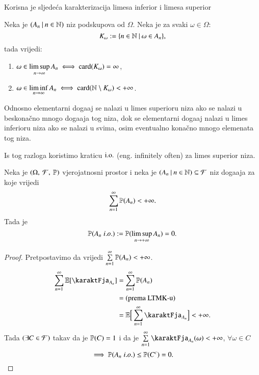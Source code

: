 Korisna je sljede\' ca karakterizacija limesa inferior i limesa superior

\begin{prop}    \label{prop:9.1-2}
    Neka je $({A_n} \: | \: {n \in \mathbb{N}})$ niz podskupova od $\Omega$.
    Neka je za svaki $\omega \in \Omega$:
    \begin{equation*}
        K_\omega := \{{n \in \mathbb{N}} \: | \: {\omega \in A_n}\},
    \end{equation*}
    tada vrijedi:
    \begin{enumerate}[label=(\arabic*)]
        \item $\omega \in \limsup\limits_{n \to \infty} A_n \iff \textnormal{card}({K_\omega}) = \infty$,
        \item $\omega \in \liminf\limits_{n \to \infty} A_n \iff \textnormal{card}({\mathbb{N} \setminus K_\omega}) < +\infty$.
    \end{enumerate}
\end{prop}

Odnosno elementarni doga\dj aj se nalazi u limes superioru niza ako se nalazi u beskona\v cno mnogo doga\dj aja tog niza, dok se elementarni doga\dj aj nalazi u limes inferioru niza ako se nalazi u svima, osim eventualno kona\v cno mnogo elemenata tog niza.

Is tog razloga koristimo kraticu $\mathrm{i.o.}$ (eng. infinitely often) za limes superior niza.

\begin{lm}  \label{lm:9.2}
    Neka je $(\Omega, \: \mathcal{F}, \: \mathbb{P})$ vjerojatnosni prostor i neka je $({A_n} \: | \: {n \in \mathbb{N}}) \subseteq \mathcal{F}$ niz doga\dj aja za koje vrijedi
    \begin{equation*}
        \sum\limits_{n = 1}^{\infty} \mathbb{P}({A_n}) < +\infty.
    \end{equation*}
    Tada je
    \begin{equation*}
        \mathbb{P}({A_n \; i.o.}) := \mathbb{P}({\limsup\limits_{n \to +\infty} A_n}) = 0.
    \end{equation*}
\end{lm}

\begin{proof}
    Pretpostavimo da vrijedi
    $\sum\limits_{n = 1}^{\infty} \mathbb{P}({A_n}) < +\infty$.
    \begin{equation*}
        \begin{aligned}
            \suma{n = 1}{\infty} \masE [ \karaktFja_{A_n} ] &= \suma{n = 1}{\infty} \vjeroj{A_n}\\
            &= (\textnormal{prema LTMK-u})\\
            &= \masE \Big[ \suma{n = 1}{\infty} \karaktFja_{A_n} \Big] < +\infty.
        \end{aligned}
    \end{equation*}
    Tada $(\exists C \in \mathcal{F})$ takav da je $\mathbb{P}({C}) = 1$ i da je $\suma{n = 1}{\infty} \karaktFja_{A_n}(\omega) < +\infty$, $\forall \omega \in C$
    \begin{equation*}
        \implies \mathbb{P}({A_n \; i.o.}) \leq \mathbb{P}({C^c}) = 0. 
    \end{equation*}
\end{proof}

